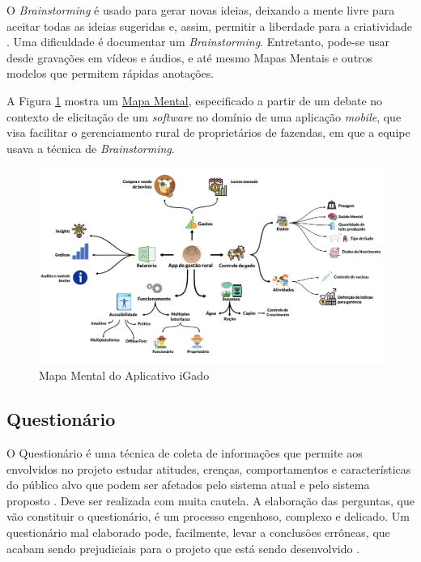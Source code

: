 O \textit{Brainstorming} é usado para gerar novas ideias, deixando a mente livre para aceitar todas as ideias sugeridas e, assim, permitir a liberdade para a criatividade \cite{batista2003taxonomia}. Uma dificuldade é documentar um \textit{Brainstorming}. Entretanto, pode-se usar desde gravações em vídeos e áudios, e até mesmo Mapas Mentais e outros modelos que permitem rápidas anotações.

A Figura \ref{fig:mind_map} mostra um \href{https://unbarqdsw.github.io/2020.1_G13_iGado/#/docs/Product/MindMap}{Mapa Mental}, especificado a partir de um debate no contexto de elicitação de um \textit{software} no domínio de uma aplicação \textit{mobile}, que visa facilitar o gerenciamento rural de proprietários de fazendas, em que a equipe usava a técnica de \textit{Brainstorming}.

\begin{figure}[H]
    \begin{center}
        \caption{Mapa Mental do Aplicativo iGado}
        \label{fig:mind_map}
        \includegraphics[scale=0.25]{figuras/Embasamento/MindMap_v2.png}
    \end{center}
\end{figure}

\subsection{Questionário}

\label{sec:questionario}

O Questionário é uma técnica de coleta de informações que permite aos envolvidos no projeto estudar atitudes, crenças, comportamentos e características do público alvo que podem ser afetados pelo sistema atual e pelo sistema proposto \cite{kendall1992systems}. Deve ser realizada com muita cautela. A elaboração das perguntas, que vão constituir o questionário, é um processo engenhoso, complexo e delicado. Um questionário mal elaborado pode, facilmente, levar a conclusões errôneas, que acabam sendo prejudiciais para o projeto que está sendo desenvolvido \cite{bastosjunior}.

